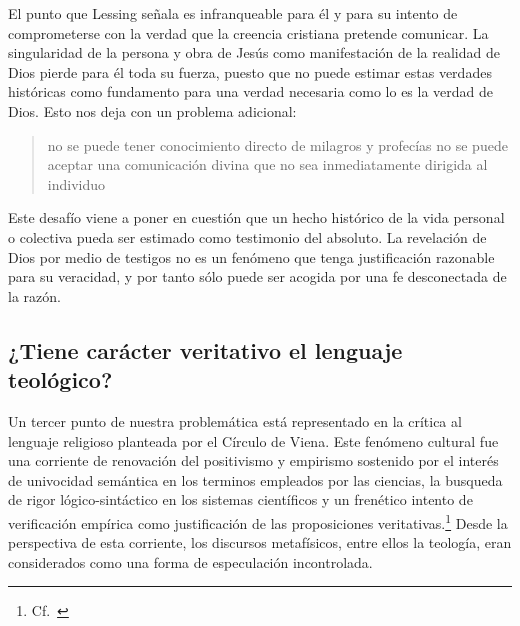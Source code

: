 El punto que Lessing señala es infranqueable para él y para su intento de
comprometerse con la verdad que la creencia cristiana pretende comunicar. La
singularidad de la persona y obra de Jesús como manifestación de la realidad de
Dios pierde para él toda su fuerza, puesto que no puede estimar estas verdades
históricas como fundamento para una verdad necesaria como lo es la verdad de
Dios. Esto nos deja con un problema adicional:
\blockquote[{\cite[294]{prades2015testimonio}}]{no se puede tener conocimiento
  directo de milagros y profecías \textelp{} no se puede aceptar una
  comunicación divina que no sea inmediatamente dirigida al individuo}.

Este desafío viene a poner en cuestión que un hecho histórico de la vida
personal o colectiva pueda ser estimado como testimonio del absoluto. La
revelación de Dios por medio de testigos no es un fenómeno que tenga
justificación razonable para su veracidad, y por tanto sólo puede ser acogida
por una fe desconectada de la razón.

\subsection{¿Tiene carácter veritativo el lenguaje teológico?}
Un tercer punto de nuestra problemática está representado en la crítica al
lenguaje religioso planteada por el Círculo de Viena. Este fenómeno cultural fue
una corriente de renovación del positivismo y empirismo sostenido por el interés
de univocidad semántica en los terminos empleados por las ciencias, la busqueda
de rigor lógico-sintáctico en los sistemas científicos y un frenético intento de
verificación empírica como justificación de las proposiciones
veritativas.\footnote{Cf.~\cite[152]{dominguez2009at}} Desde la perspectiva de
esta corriente, los discursos metafísicos, entre ellos la teología, eran
considerados como una forma de especulación incontrolada.

